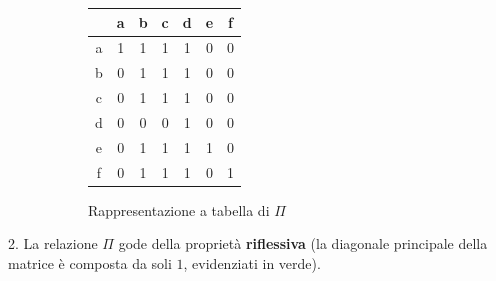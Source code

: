 \documentclass[\main/main.tex]{subfiles}
\begin{document}
\begin{figure}
  \begin{subfigure}{0.49\textwidth}
      \begin{tabular}{|c|c|c|c|c|c|c|}
        \hline
          & a                      & b                      & c                      & d                      & e                      & f                      \\
        \hline
        a & \cellcolor{green!25} 1 & 1                      & 1                      & 1                      & 0                      & 0                      \\
        \hline
        b & 0                      & \cellcolor{green!25} 1 & 1                      & 1                      & 0                      & 0                      \\
        \hline
        c & 0                      & 1                      & \cellcolor{green!25} 1 & 1                      & 0                      & 0                      \\
        \hline
        d & 0                      & 0                      & 0                      & \cellcolor{green!25} 1 & 0                      & 0                      \\
        \hline
        e & 0                      & 1                      & 1                      & 1                      & \cellcolor{green!25} 1 & 0                      \\
        \hline
        f & 0                      & 1                      & 1                      & 1                      & 0                      & \cellcolor{green!25} 1 \\
        \hline
      \end{tabular}
      \caption{Rappresentazione a tabella di $\Pi$}
  \end{subfigure}
  \begin{subfigure}{0.49\textwidth}
    \ReflexivePreferenceRelationship{}
  \end{subfigure}
\end{figure}

2. La relazione $\Pi$ gode della proprietà \textbf{riflessiva} (la diagonale principale della matrice è composta da soli $1$, evidenziati in verde).
\end{document}
